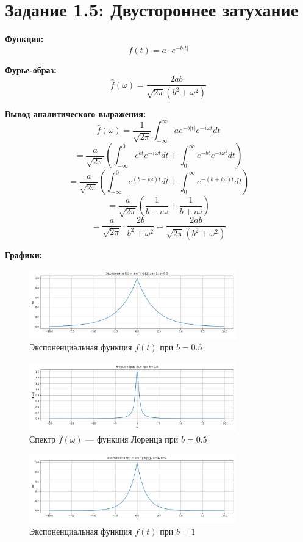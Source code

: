 \section*{Задание 1.5: Двустороннее затухание}

\textbf{Функция:}
\[
f(t) = a \cdot e^{-b |t|}
\]

\textbf{Фурье-образ:}
\[
\hat{f}(\omega) = \frac{2ab}{\sqrt{2\pi}(b^2 + \omega^2)}
\]

\textbf{Вывод аналитического выражения:}
\[
\hat{f}(\omega) = \frac{1}{\sqrt{2\pi}} \int_{-\infty}^{\infty} a e^{-b |t|} e^{-i \omega t} dt
\]
\[
= \frac{a}{\sqrt{2\pi}} \left( \int_{-\infty}^{0} e^{b t} e^{-i \omega t} dt + \int_{0}^{\infty} e^{-b t} e^{-i \omega t} dt \right)
\]
\[
= \frac{a}{\sqrt{2\pi}} \left( \int_{-\infty}^{0} e^{(b - i \omega) t} dt + \int_{0}^{\infty} e^{-(b + i \omega) t} dt \right)
\]
\[
= \frac{a}{\sqrt{2\pi}} \left( \frac{1}{b - i \omega} + \frac{1}{b + i \omega} \right)
\]
\[
= \frac{a}{\sqrt{2\pi}} \cdot \frac{2b}{b^2 + \omega^2} = \frac{2ab}{\sqrt{2\pi}(b^2 + \omega^2)}
\]

\textbf{Графики:}

\begin{figure}[H]
    \centering
    \includegraphics[width=0.8\textwidth]{exp_function_b0.5.png}
    \caption{Экспоненциальная функция $f(t)$ при $b = 0.5$}
\end{figure}

\begin{figure}[H]
    \centering
    \includegraphics[width=0.8\textwidth]{exp_spectrum_b0.5.png}
    \caption{Спектр $\hat{f}(\omega)$ — функция Лоренца при $b = 0.5$}
\end{figure}

\begin{figure}[H]
    \centering
    \includegraphics[width=0.8\textwidth]{exp_function_b1.png}
    \caption{Экспоненциальная функция $f(t)$ при $b = 1$}
\end{figure}


